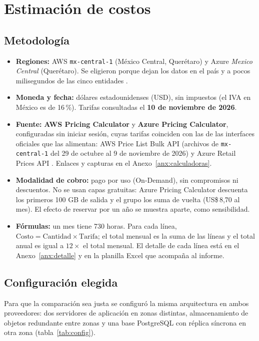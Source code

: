 \documentclass[11pt,letterpaper]{article}
\newcommand{\usd}[1]{US\$\,#1}
\begin{document}
\section{Estimación de costos}\label{sec:costos}
\subsection{Metodología}
\begin{itemize}
  \item \textbf{Regiones:} AWS \texttt{mx-central-1} (México Central, Querétaro) y Azure \emph{Mexico Central} (Querétaro). Se eligieron porque dejan los datos en el país y a pocos milisegundos de las cinco entidades \parencite{aws-regions,az-geos}.
  \item \textbf{Moneda y fecha:} dólares estadounidenses (USD), sin impuestos (el IVA en México es de 16\,\%). Tarifas consultadas el \textbf{10 de noviembre de 2026}.
  \item \textbf{Fuente:} \textbf{AWS Pricing Calculator} y \textbf{Azure Pricing Calculator}, configuradas sin iniciar sesión, cuyas tarifas coinciden con las de las interfaces oficiales que las alimentan: AWS Price List Bulk API (archivos de \texttt{mx-central-1} del 29 de octubre al 9 de noviembre de 2026) y Azure Retail Prices API \parencite{aws-calc,az-calc,aws-pricelist,az-retail}. Enlaces y capturas en el Anexo~\ref{anx:calculadoras}.
  \item \textbf{Modalidad de cobro:} pago por uso (On-Demand), sin compromisos ni descuentos. No se usan capas gratuitas: Azure Pricing Calculator descuenta los primeros 100 GB de salida y el grupo los suma de vuelta (\usd{8,70} al mes). El efecto de reservar por un año se muestra aparte, como sensibilidad.
  \item \textbf{Fórmulas:} un mes tiene 730 horas. Para cada línea, \(\text{Costo} = \text{Cantidad} \times \text{Tarifa}\); el total mensual es la suma de las líneas y el total anual es igual a \(12 \times\) el total mensual. El detalle de cada línea está en el Anexo~\ref{anx:detalle} y en la planilla Excel que acompaña al informe.
\end{itemize}

\subsection{Configuración elegida}
Para que la comparación sea justa se configuró la misma arquitectura en ambos proveedores: dos servidores de aplicación en zonas distintas, almacenamiento de objetos redundante entre zonas y una base PostgreSQL con réplica síncrona en otra zona (tabla~\ref{tab:config}).
\end{document}
